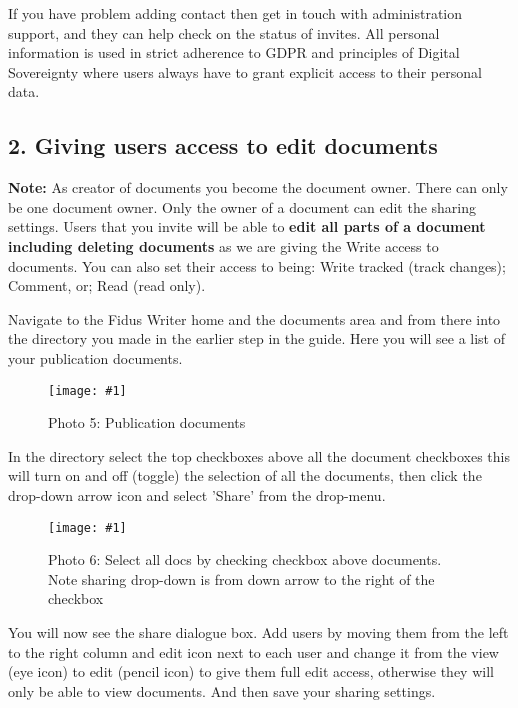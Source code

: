 \documentclass{article}
\newlength{\imgwidth}
\newcommand\scaledgraphics[2]{%
                
\settowidth{\imgwidth}{\texttt{[image: \#1]}}%
                
\setlength{\imgwidth}{\minof{\imgwidth}{#2\textwidth}}%
                
\texttt{[image: \#1]}%
                
}
\begin{document}
If you have problem adding contact then get in touch with administration support, and they can help check on the status of invites. All personal information is used in strict adherence to GDPR and principles of Digital Sovereignty where users always have to grant explicit access to their personal data.


\subsection{2. Giving users access to edit documents}\label{H9350209}



\textbf{Note:} As creator of documents you become the document owner. There can only be one document owner. Only the owner of a document can edit the sharing settings. Users that you invite will be able to \textbf{edit all parts of a document including deleting documents} as we are giving the Write access to documents. You can also set their access to being: Write tracked (track changes); Comment, or; Read (read only).


Navigate to the Fidus Writer home and the documents area and from there into the directory you made in the earlier step in the guide. Here you will see a list of your publication documents.

\begin{figure}
\scaledgraphics{ecfbd0c0-16ae-4aa4-94bc-e993d00c5c66.png}{1}
\caption*{Photo 5: Publication documents}\label{F94960221}
\end{figure}


In the directory select the top checkboxes above all the document checkboxes this will turn on and off (toggle) the selection of all the documents, then click the drop-down arrow icon and select 'Share' from the drop-menu.

\begin{figure}
\scaledgraphics{c0ffcd80-a1bb-4767-9f01-e4f6403be9db.png}{1}
\caption*{Photo 6: Select all docs by checking checkbox above documents. Note sharing drop-down is from down arrow to the right of the checkbox}\label{F83659771}
\end{figure}


You will now see the share dialogue box. Add users by moving them from the left to the right column and edit icon next to each user and change it from the view (eye icon) to edit (pencil icon) to give them full edit access, otherwise they will only be able to view documents. And then save your sharing settings. 
\end{document}

